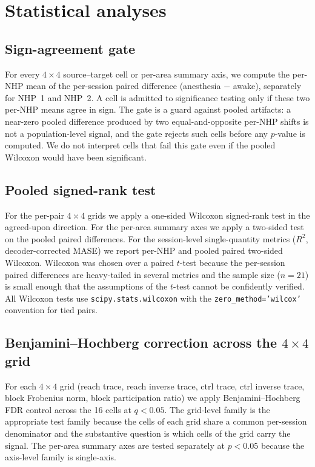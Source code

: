 \section{Statistical analyses}\label{supp:interareal-control-stats}

\subsection{Sign-agreement gate}\label{supp:interareal-control-sign-agree}

For every $4\!\times\!4$ source--target cell or per-area summary axis, we compute the per-NHP mean of the per-session paired difference (anesthesia $-$ awake), separately for NHP~1 and NHP~2. A cell is admitted to significance testing only if these two per-NHP means agree in sign. The gate is a guard against pooled artifacts: a near-zero pooled difference produced by two equal-and-opposite per-NHP shifts is not a population-level signal, and the gate rejects such cells before any $p$-value is computed. We do not interpret cells that fail this gate even if the pooled Wilcoxon would have been significant.

\subsection{Pooled signed-rank test}\label{supp:interareal-control-wilcoxon}

For the per-pair $4\!\times\!4$ grids we apply a one-sided Wilcoxon signed-rank test in the agreed-upon direction. For the per-area summary axes we apply a two-sided test on the pooled paired differences. For the session-level single-quantity metrics ($R^{2}$, decoder-corrected MASE) we report per-NHP and pooled paired two-sided Wilcoxon. Wilcoxon was chosen over a paired $t$-test because the per-session paired differences are heavy-tailed in several metrics and the sample size ($n=21$) is small enough that the assumptions of the $t$-test cannot be confidently verified. All Wilcoxon tests use \texttt{scipy.stats.wilcoxon} with the \texttt{zero\_method='wilcox'} convention for tied pairs.

\subsection{Benjamini--Hochberg correction across the $4\!\times\!4$ grid}\label{supp:interareal-control-bh}

For each $4\!\times\!4$ grid (reach trace, reach inverse trace, ctrl trace, ctrl inverse trace, block Frobenius norm, block participation ratio) we apply Benjamini--Hochberg FDR control across the 16 cells at $q<0.05$. The grid-level family is the appropriate test family because the cells of each grid share a common per-session denominator and the substantive question is which cells of the grid carry the signal. The per-area summary axes are tested separately at $p<0.05$ because the axis-level family is single-axis.

